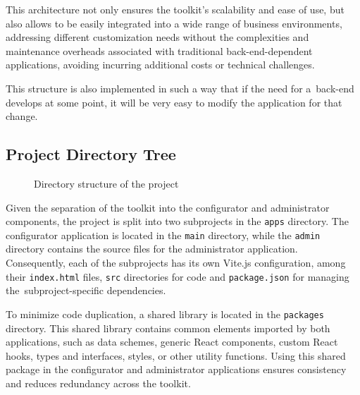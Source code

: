 This architecture not only ensures the toolkit's scalability and ease of use, but also allows to be easily integrated into a wide range of business environments, addressing different customization needs without the complexities and maintenance overheads associated with traditional back-end-dependent applications, avoiding incurring additional costs or technical challenges.

This structure is also implemented in such a way that if the need for a~back-end develops at some point, it will be very easy to modify the application for that change.

\subsection{Project Directory Tree}

\begin{figure}[h]
    \centering
    \begin{minipage}{0.4\textwidth}
    \end{minipage}
    \caption{Directory structure of the project}
    \label{fig:directory-tree}
\end{figure}

Given the separation of the toolkit into the configurator and administrator components, the project is split into two subprojects in the \texttt{apps} directory. The configurator application is located in the \texttt{main} directory, while the \texttt{admin} directory contains the source files for the administrator application. Consequently, each of the subprojects has its own Vite.js configuration, among their \texttt{index.html} files, \texttt{src} directories for code and \texttt{package.json} for managing the~subproject-specific dependencies. 

To minimize code duplication, a shared library is located in the \texttt{packages} directory. This shared library contains common elements imported by both applications, such as data schemes, generic React components, custom React hooks, types and interfaces,  styles, or other utility functions. Using this shared package in the configurator and administrator applications ensures consistency and reduces redundancy across the toolkit.

